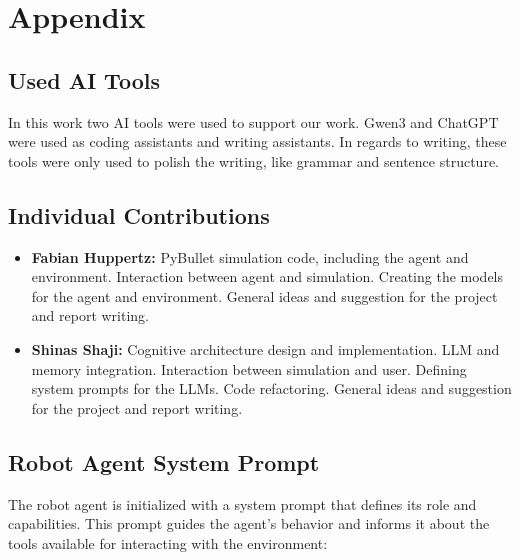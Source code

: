 \documentclass[../report.tex]{subfiles}
\begin{document}
\section*{Appendix}
\label{sec:appendix}

\subsection*{Used AI Tools}
In this work two AI tools were used to support our work. Gwen3 and ChatGPT were used as coding assistants and writing assistants. In regards to writing, these tools were only used to polish the writing, like grammar and sentence structure.

\subsection*{Individual Contributions}
\begin{itemize}
	\item \textbf{Fabian Huppertz:} PyBullet simulation code, including the agent and environment. Interaction between agent and simulation. Creating the models for the agent and environment. General ideas and suggestion for the project and report writing.
	\item \textbf{Shinas Shaji:} Cognitive architecture design and implementation. LLM and memory integration. Interaction between simulation and user. Defining system prompts for the LLMs. Code refactoring. General ideas and suggestion for the project and report writing.
\end{itemize}

\subsection*{Robot Agent System Prompt}
The robot agent is initialized with a system prompt that defines its role and capabilities. This prompt guides the agent's behavior and informs it about the tools available for interacting with the environment:
\end{document}
